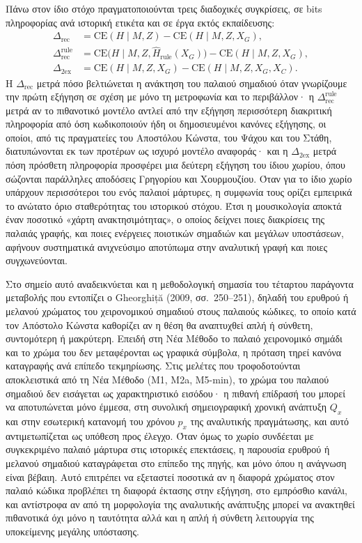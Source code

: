 \documentclass[11pt,a4paper]{article}
\begin{document}
Πάνω στον ίδιο στόχο πραγματοποιούνται τρεις διαδοχικές συγκρίσεις, σε bits πληροφορίας ανά ιστορική ετικέτα και σε έργα εκτός εκπαίδευσης:
\[
\begin{aligned}
\Delta_{\text{rec}}&=\mathrm{CE}(H\mid M,Z)-\mathrm{CE}(H\mid M,Z,X_G),\\
\Delta_{\text{rec}}^{\text{rule}}&=\mathrm{CE}\bigl(H\mid M,Z,\widehat H_{\text{rule}}(X_G)\bigr)-\mathrm{CE}(H\mid M,Z,X_G),\\
\Delta_{\text{2ex}}&=\mathrm{CE}(H\mid M,Z,X_G)-\mathrm{CE}(H\mid M,Z,X_G,X_C).
\end{aligned}
\]
Η $\Delta_{\text{rec}}$ μετρά πόσο βελτιώνεται η ανάκτηση του παλαιού σημαδιού όταν γνωρίζουμε την πρώτη εξήγηση σε σχέση με μόνο τη μετροφωνία και το περιβάλλον· η $\Delta_{\text{rec}}^{\text{rule}}$ μετρά αν το πιθανοτικό μοντέλο αντλεί από την εξήγηση περισσότερη διακριτική πληροφορία από όση κωδικοποιούν ήδη οι δημοσιευμένοι κανόνες εξήγησης, οι οποίοι, από τις πραγματείες του Αποστόλου Κώνστα, του Ψάχου και του Στάθη, διατυπώνονται εκ των προτέρων ως ισχυρό μοντέλο αναφοράς· και η $\Delta_{\text{2ex}}$ μετρά πόση πρόσθετη πληροφορία προσφέρει μια δεύτερη εξήγηση του ίδιου χωρίου, όπου σώζονται παράλληλες αποδόσεις Γρηγορίου και Χουρμουζίου. Όταν για το ίδιο χωρίο υπάρχουν περισσότεροι του ενός παλαιοί μάρτυρες, η συμφωνία τους ορίζει εμπειρικά το ανώτατο όριο σταθερότητας του ιστορικού στόχου. Έτσι η μουσικολογία αποκτά έναν ποσοτικό «χάρτη ανακτησιμότητας», ο οποίος δείχνει ποιες διακρίσεις της παλαιάς γραφής, και ποιες ενέργειες ποιοτικών σημαδιών και μεγάλων υποστάσεων, αφήνουν συστηματικά ανιχνεύσιμο αποτύπωμα στην αναλυτική γραφή και ποιες συγχωνεύονται.

Στο σημείο αυτό αναδεικνύεται και η μεθοδολογική σημασία του τέταρτου παράγοντα μεταβολής που εντοπίζει ο Gheorghiță (2009, σσ.~250--251), δηλαδή του ερυθρού ή μελανού χρώματος του χειρονομικού σημαδιού στους παλαιούς κώδικες, το οποίο κατά τον Απόστολο Κώνστα καθορίζει αν η θέση θα αναπτυχθεί απλή ή σύνθετη, συντομότερη ή μακρύτερη. Επειδή στη Νέα Μέθοδο το παλαιό χειρονομικό σημάδι και το χρώμα του δεν μεταφέρονται ως γραφικά σύμβολα, η πρόταση τηρεί κανόνα καταγραφής ανά επίπεδο τεκμηρίωσης. Στις μελέτες που τροφοδοτούνται αποκλειστικά από τη Νέα Μέθοδο (Μ1, Μ2a, Μ5-min), το χρώμα του παλαιού σημαδιού δεν εισάγεται ως χαρακτηριστικό εισόδου· η πιθανή επίδρασή του μπορεί να αποτυπώνεται μόνο έμμεσα, στη συνολική σημειογραφική χρονική ανάπτυξη $Q_x$ και στην εσωτερική κατανομή του χρόνου $p_x$ της αναλυτικής πραγμάτωσης, και αυτό αντιμετωπίζεται ως υπόθεση προς έλεγχο. Όταν όμως το χωρίο συνδέεται με συγκεκριμένο παλαιό μάρτυρα στις ιστορικές επεκτάσεις, η παρουσία ερυθρού ή μελανού σημαδιού καταγράφεται στο επίπεδο της πηγής, και μόνο όπου η ανάγνωση είναι βέβαιη. Αυτό επιτρέπει να εξεταστεί ποσοτικά αν η διαφορά χρώματος στον παλαιό κώδικα προβλέπει τη διαφορά έκτασης στην εξήγηση, στο εμπρόσθιο κανάλι, και αντίστροφα αν από τη μορφολογία της αναλυτικής ανάπτυξης μπορεί να ανακτηθεί πιθανοτικά όχι μόνο η ταυτότητα αλλά και η απλή ή σύνθετη λειτουργία της υποκείμενης μεγάλης υπόστασης.
\end{document}
